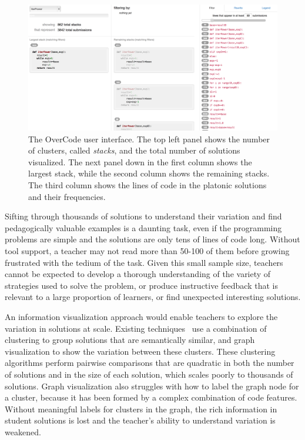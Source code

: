 \begin{figure}[t!]
\centering
\includegraphics[width=1.0\linewidth]{Body/figures/overcode/interfaceScreenShot.png}
\caption{The OverCode user interface. The top left panel shows the number of clusters, called {\it stacks}, and the total number of solutions visualized. The next panel down in the first column shows the largest stack, while the second column shows the remaining stacks. The third column shows the lines of code in the platonic solutions and their frequencies.}
\label{overcode_fullinterface}
\end{figure}

Sifting through thousands of solutions to understand their variation and find pedagogically valuable examples is a daunting task, even if the programming problems are simple and the solutions are only tens of lines of code long. Without tool support, a teacher may not read more than 50-100 of them before growing frustrated with the tedium of the task. Given this small sample size, teachers cannot be expected to develop a thorough understanding of the variety of strategies used to solve the problem, or produce instructive feedback that is relevant to a large proportion of learners, or find unexpected interesting solutions.

An information visualization approach would enable teachers to explore the variation in solutions at scale. Existing techniques~\cite{gradingsigcse14,MOOCshop,codewebs} use a combination of clustering to group solutions that are semantically similar, and graph visualization to show the variation between these clusters. These clustering algorithms perform pairwise comparisons that are quadratic in both the number of solutions and in the size of each solution, which scales poorly to thousands of solutions. Graph visualization also struggles with how to label the graph node for a cluster, because it has been formed by a complex combination of code features. Without meaningful labels for clusters in the graph, the rich information in student solutions is lost and the teacher's ability to understand variation is weakened.

